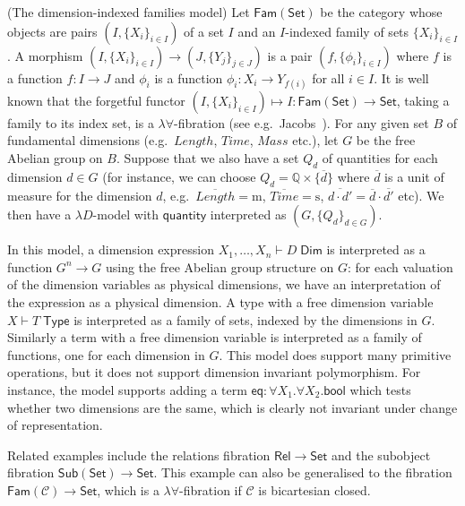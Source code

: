 \documentclass[a4paper,UKenglish]{lipics}
\newcommand{\msf}[1]{\mathsf{#1}} %
\newcommand{\Set}{\msf{Set}}
\newcommand{\Fam}[1]{\msf{Fam}(#1)}
\newcommand{\Sub}[1]{\msf{Sub}(#1)}
\newcommand{\Rel}{\msf{Rel}}
\newcommand{\C}{\mathcal{C}}
\newcommand{\bbQ}{\mathbb{Q}}
\newcommand{\qnt}{\msf{quantity}}
\newcommand{\bool}{\msf{bool}}
\newcommand{\lengthDim}{\mathit{Length}}
\newcommand{\timeDim}{\mathit{Time}}
\newcommand{\massDim}{\mathit{Mass}}
\newcommand{\Tj}[2]{#1 \vdash #2 \; \msf{ Type}}
\newcommand{\Dj}[2]{#1 \vdash #2 \; \msf{ Dim}}
\newcommand{\Dim}{D}
\newcommand{\Dvar}{X}
\begin{document}
\begin{example}(The dimension-indexed families model)
\label{example:famset}
Let $\Fam\Set$ be the category whose objects are pairs
$(I,\{X_i\}_{i\in I})$ of a set $I$ and an $I$-indexed family of sets
$\{X_i\}_{i\in I}$. A morphism $(I,\{X_i\}_{i\in I}) \to
(J,\{Y_j\}_{j\in J})$ is a pair $(f,\{\phi_i\}_{i\in I})$ where $f$ is
a function $f:I\to J$ and $\phi_i$ is a function $\phi_i:X_i\to
Y_{f(i)}$ for all $i\in I$. It is well known that the forgetful
functor $(I,\{X_i\}_{i\in I}) \mapsto I : \Fam\Set\to \Set$, taking a
family to its index set, is a $\lambda\forall$-fibration (see e.g.\
Jacobs~\cite[Lemma 1.9.5]{jacobs1999categorical}).  For any given set
$B$ of fundamental dimensions (e.g.\ $\lengthDim$, $\timeDim$, $\massDim$ etc.), let $G$ be
the free Abelian group on $B$. Suppose that we also have a set $Q_d$
of quantities for each dimension $d \in G$ (for instance, we can
choose $Q_d = \bbQ \times \{ \overline{d} \}$ where $\overline{d}$ is
a unit of measure for the dimension $d$, e.g.\
$\overline{\lengthDim} = \mathrm m$, $\overline{\timeDim} = \mathrm s$,
$\overline{d\cdot d'} = \overline{d}\cdot\overline{d'}$ etc). We then
have a $\lambda D$-model with $\qnt$ interpreted as $(G,\{Q_d\}_{d\in
  G})$.

In this model, a dimension expression $\Dj{\Dvar_1,\dots, \Dvar_n}
\Dim$ is interpreted as a function $G^n\to G$ using the free Abelian
group structure on $G$: for each valuation of the dimension variables
as physical dimensions, we have an interpretation of the expression as
a physical dimension. A type with a free dimension variable $\Tj \Dvar
T$ is interpreted as a family of sets, indexed by the dimensions in
$G$. Similarly a term with a free dimension variable is interpreted as
a family of functions, one for each dimension in $G$. This model does
support many primitive operations, but it does not support dimension
invariant polymorphism. For instance, the model supports adding a term
$\mathsf{eq}:\forall \Dvar_1.\forall \Dvar_2.\bool$ which tests
whether two dimensions are the same, which is clearly not invariant
under change of representation.

Related examples include the relations fibration $\Rel \to \Set$ and
the subobject fibration $\Sub{\Set} \to \Set$. This example can also
be generalised to the fibration $\Fam{\C}\to\Set$, which is a
$\lambda\forall$-fibration if $\C$ is bicartesian closed.

\end{example}
\end{document}
